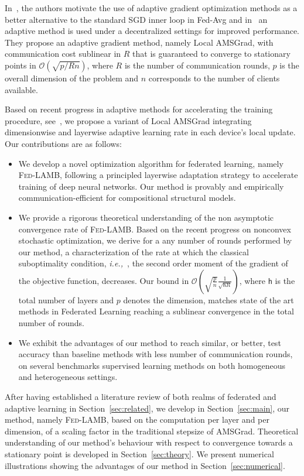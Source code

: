 \documentclass[11pt]{article}
\def\tot{\mathsf{h}}
\newcommand{\ie}{{\em i.e.,~}}
\newcommand{\algo}{\textsc{Fed-LAMB}}
\begin{document}
In~\cite{chen2020toward}, the authors motivate the use of adaptive gradient optimization methods as a better alternative to the standard SGD inner loop in Fed-Avg and in~\cite{chen2021convergent} an adaptive method is used under a decentralized settings for improved performance.
They propose an adaptive gradient method, namely Local AMSGrad, with communication cost sublinear in $R$ that is guaranteed to converge to stationary points in $\mathcal{O}(\sqrt{p/Rn})$, where $R$ is the number of communication rounds, $p$ is the overall dimension of the problem and $n$ corresponds to the number of clients available.

Based on recent progress in adaptive methods for accelerating the training procedure, see~\cite{you2019large}, we propose a variant of Local AMSGrad integrating dimensionwise and layerwise adaptive learning rate in each device's local update.
Our contributions are as follows:
\begin{itemize}
\item We develop a novel optimization algorithm for federated learning, namely \algo, following a principled layerwise adaptation strategy to accelerate training of deep neural networks. Our method is provably and empirically communication-efficient for compositional structural models.
\item We provide a rigorous theoretical understanding of the non asymptotic convergence rate of \algo. 
Based on the recent progress on nonconvex stochastic optimization, we derive for a any number of rounds performed by our method, a characterization of the rate at which the classical suboptimality condition, \ie, the second order moment of the gradient of the objective function, decreases. Our bound  in $\mathcal{O}\left(\sqrt{\frac{ p}{ n}} \frac{1}{\sqrt{\tot R} } \right)$, where $\tot$ is the total number of layers and $p$ denotes the dimension, matches state of the art methods in Federated Learning reaching a sublinear convergence in the total number of rounds.
\item We exhibit the advantages of our method to reach similar, or better, test accuracy than baseline methods with less number of communication rounds, on several benchmarks supervised learning methods on both homogeneous and heterogeneous settings.
\end{itemize}

After having established a literature review of both realms of federated and adaptive learning in Section~\ref{sec:related}, we develop in Section~\ref{sec:main}, our method, namely \algo, based on the computation per layer and per dimension, of a scaling factor in the traditional stepsize of AMSGrad.
Theoretical understanding of our method's behaviour with respect to convergence towards a stationary point is developed in Section~\ref{sec:theory}.
We present numerical illustrations showing the advantages of our method in Section~\ref{sec:numerical}.
\end{document}
